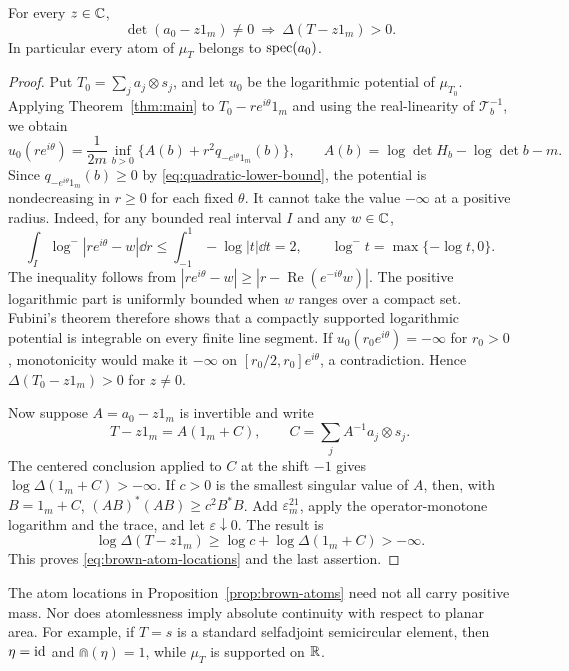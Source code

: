 \begin{proposition}\label{prop:brown-atoms}
For every $z\in\mathbb C$,
\begin{equation}\label{eq:brown-atom-locations}
 \det(a_0-z1_m)\ne0\ \Longrightarrow\ \Delta(T-z1_m)>0.
\end{equation}
In particular every atom of $\mu_T$ belongs to $\operatorname{spec}(a_0)$.
\end{proposition}
\begin{proof}
Put $T_0=\sum_j a_j\otimes s_j$, and let $u_0$ be the logarithmic potential of $\mu_{T_0}$.
Applying Theorem~\ref{thm:main} to $T_0-re^{i\theta}1_m$ and using the real-linearity of $\mathcal T_b^{-1}$, we obtain
\begin{equation}\label{eq:brown-ray-monotonicity}
 u_0(re^{i\theta})=\frac1{2m}\inf_{b>0}
 \{A(b)+r^2q_{-e^{i\theta}1_m}(b)\},\qquad
 A(b)=\log\det H_b-\log\det b-m.
\end{equation}
Since $q_{-e^{i\theta}1_m}(b)\ge0$ by \eqref{eq:quadratic-lower-bound}, the potential is nondecreasing in $r\ge0$ for each fixed $\theta$.
It cannot take the value $-\infty$ at a positive radius.
Indeed, for any bounded real interval $I$ and any $w\in\mathbb C$,
\[
 \int_I\log^-|re^{i\theta}-w|\dd r
 \le\int_{-1}^1-\log|t|\dd t=2,
 \qquad \log^-t=\max\{-\log t,0\}.
\]
The inequality follows from $|re^{i\theta}-w|\ge|r-\operatorname{Re}(e^{-i\theta}w)|$.
The positive logarithmic part is uniformly bounded when $w$ ranges over a compact set.
Fubini's theorem therefore shows that a compactly supported logarithmic potential is integrable on every finite line segment.
If $u_0(r_0e^{i\theta})=-\infty$ for $r_0>0$, monotonicity would make it $-\infty$ on $[r_0/2,r_0]e^{i\theta}$, a contradiction.
Hence $\Delta(T_0-z1_m)>0$ for $z\ne0$.

Now suppose $A=a_0-z1_m$ is invertible and write
\[
 T-z1_m=A(1_m+C),\qquad
 C=\sum_j A^{-1}a_j\otimes s_j.
\]
The centered conclusion applied to $C$ at the shift $-1$ gives $\log\Delta(1_m+C)>-\infty$.
If $c>0$ is the smallest singular value of $A$, then, with $B=1_m+C$, $(AB)^*(AB)\ge c^2B^*B$.
Add $\varepsilon^21_m$, apply the operator-monotone logarithm and the trace, and let $\varepsilon\downarrow0$.
The result is
\[
 \log\Delta(T-z1_m)\ge\log c+\log\Delta(1_m+C)>-\infty.
\]
This proves \eqref{eq:brown-atom-locations} and the last assertion.
\end{proof}

The atom locations in Proposition~\ref{prop:brown-atoms} need not all carry positive mass.
Nor does atomlessness imply absolute continuity with respect to planar area.
For example, if $T=s$ is a standard selfadjoint semicircular element, then $\eta=\operatorname{id}$ and $\Cap(\eta)=1$, while $\mu_T$ is supported on $\mathbb R$.

